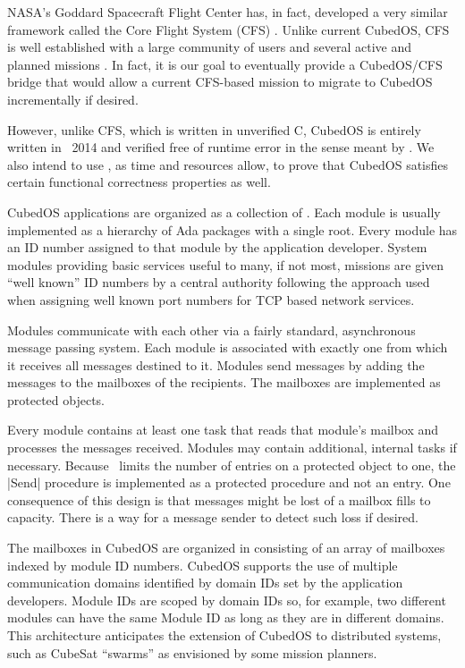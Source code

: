 NASA's Goddard Spacecraft Flight Center has, in fact, developed a very similar framework called
the Core Flight System (CFS) . Unlike current CubedOS, CFS is well
established with a large community of users and several active and planned missions
. In fact, it is our goal to eventually provide a CubedOS/CFS bridge that
would allow a current CFS-based mission to migrate to CubedOS incrementally if desired.

However, unlike CFS, which is written in unverified C, CubedOS is entirely written in \SPARK\
2014 and verified free of runtime error in the sense meant by \SPARK. We also intend to use
\SPARK, as time and resources allow, to prove that CubedOS satisfies certain functional
correctness properties as well.

CubedOS applications are organized as a collection of . Each module is usually
implemented as a hierarchy of Ada packages with a single root. Every module has an ID number
assigned to that module by the application developer. System modules providing basic services
useful to many, if not most, missions are given ``well known'' ID numbers by a central authority
following the approach used when assigning well known port numbers for TCP based network
services.

Modules communicate with each other via a fairly standard, asynchronous message passing system.
Each module is associated with exactly one \newterm{mailbox} from which it receives all messages
destined to it. Modules send messages by adding the messages to the mailboxes of the recipients.
The mailboxes are implemented as protected objects.

Every module contains at least one task that reads that module's mailbox and processes the
messages received. Modules may contain additional, internal tasks if necessary. Because \SPARK\
limits the number of entries on a protected object to one, the |Send| procedure is implemented
as a protected procedure and not an entry. One consequence of this design is that messages might
be lost of a mailbox fills to capacity. There is a way for a message sender to detect such loss
if desired.

The mailboxes in CubedOS are organized in  consisting of an array
of mailboxes indexed by module ID numbers. CubedOS supports the use of multiple communication
domains identified by domain IDs set by the application developers. Module IDs are scoped by
domain IDs so, for example, two different modules can have the same Module ID as long as they
are in different domains. This architecture anticipates the extension of CubedOS to distributed
systems, such as CubeSat ``swarms'' as envisioned by some mission planners.

